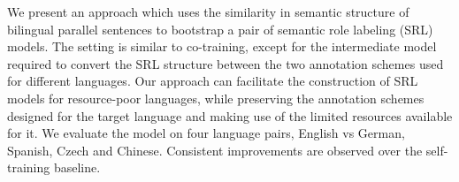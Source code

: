 We present an approach which uses the similarity in semantic structure of bilingual parallel sentences to bootstrap a pair of semantic role labeling
 (SRL) models.
 The setting is similar to co-training, except for the intermediate model
 required to convert the SRL structure between the two annotation schemes used
 for different languages.
 Our approach can facilitate the construction of SRL models for resource-poor
 languages, while preserving the annotation schemes designed for the target
 language and making use of the limited resources available for it.
 We evaluate the model on four language pairs, English vs German, Spanish, Czech
 and Chinese.
 Consistent improvements are observed over the self-training baseline.

